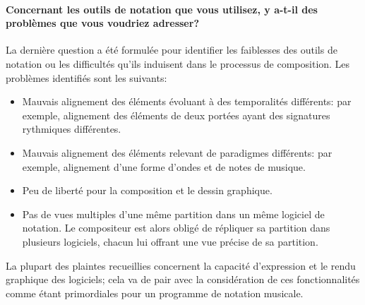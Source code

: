 \paragraph{Concernant les outils de notation que vous utilisez, y a-t-il des problèmes que vous voudriez adresser?} La dernière question a été formulée pour identifier les faiblesses des outils de notation ou les difficultés qu'ils induisent dans le processus de composition.  Les problèmes identifiés sont les suivants:
\begin{itemize}[label=--]
	\item Mauvais alignement des éléments évoluant à des temporalités différents: par exemple, alignement des éléments de deux portées ayant des signatures rythmiques différentes.
	\item Mauvais alignement des éléments relevant de paradigmes différents: par exemple, alignement d'une forme d'ondes et de notes de musique.
	\item Peu de liberté pour la composition et le dessin graphique.
	\item Pas de vues multiples d'une même partition dans un même logiciel de notation. Le compositeur est alors obligé de répliquer sa partition dans plusieurs logiciels, chacun lui offrant une vue précise de sa partition.
\end{itemize}

La plupart des plaintes recueillies concernent la capacité d'expression et le rendu graphique des logiciels; cela va de pair avec la considération de ces fonctionnalités comme étant primordiales pour un programme de notation musicale.
\clearpage

